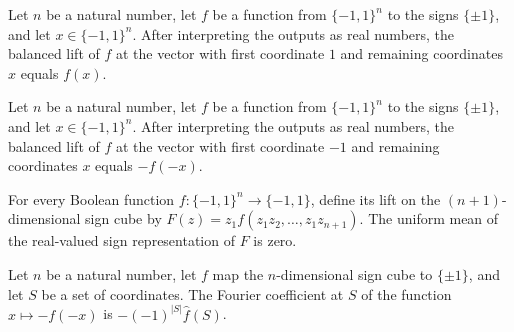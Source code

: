 \begin{theorem}
\label{FABL.balancedFKNLift_toReal_fin_cons_one}
\leanok
{}
Let $n$ be a natural number, let $f$ be a function from $\{-1,1\}^n$ to the signs
$\{\pm1\}$, and let $x\in\{-1,1\}^n$. After interpreting the outputs as real
numbers, the balanced lift of $f$ at the vector with first coordinate $1$ and remaining
coordinates $x$ equals $f(x)$.
\end{theorem}

\begin{theorem}
\label{FABL.balancedFKNLift_toReal_fin_cons_neg_one}
\leanok
{}
Let $n$ be a natural number, let $f$ be a function from $\{-1,1\}^n$ to the signs
$\{\pm1\}$, and let $x\in\{-1,1\}^n$. After interpreting the outputs as real
numbers, the balanced lift of $f$ at the vector with first coordinate $-1$ and remaining
coordinates $x$ equals $-f(-x)$.
\end{theorem}

\begin{theorem}
\label{FABL.mean_balancedFKNLift}
\leanok
{}
For every Boolean function $f:\{-1,1\}^n\to\{-1,1\}$, define its lift on the
$(n+1)$-dimensional sign cube by $F(z)=z_1 f(z_1z_2,\ldots,z_1z_{n+1})$. The uniform
mean of the real-valued sign representation of $F$ is zero.
\end{theorem}

\begin{theorem}
\label{FABL.fourierCoeff_negatedInput_toReal}
\leanok
{}
Let $n$ be a natural number, let $f$ map the $n$-dimensional sign cube to $\{\pm1\}$,
and let $S$ be a set of coordinates. The Fourier coefficient at $S$ of the function
$x\mapsto -f(-x)$ is $-(-1)^{|S|}\widehat f(S)$.
\end{theorem}

